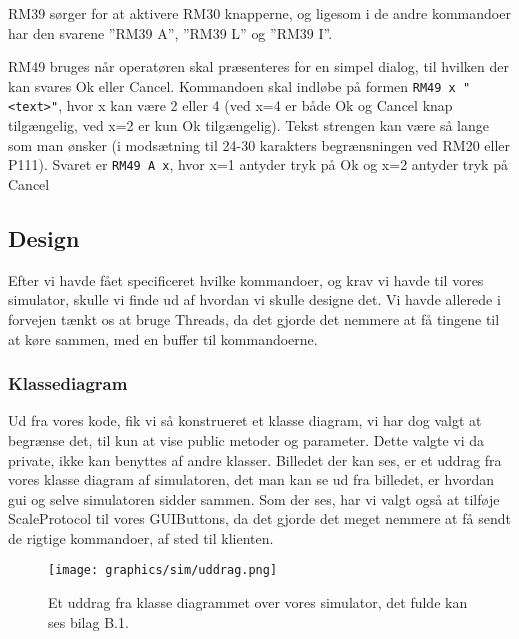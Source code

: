\documentclass[a4paper]{article}
\newenvironment{my_itemize}
{\begin{itemize}
  \setlength{\itemsep}{1pt}
  \setlength{\parskip}{0pt}
  \setlength{\parsep}{0pt}}
{\end{itemize}}
\newenvironment{changemargin}[2]{%
\begin{list}{}{%
\setlength{\topsep}{0pt}%
\setlength{\leftmargin}{#1}%
\setlength{\rightmargin}{#2}%
\setlength{\listparindent}{\parindent}%
\setlength{\itemindent}{\parindent}%
\setlength{\parsep}{\parskip}%
}%
\item[]}{\end{list}}
\begin{document}
\begin{my_itemize}
  \item RM39 sørger for at aktivere RM30 knapperne, og ligesom i de andre kommandoer har den svarene ”RM39 A”, ”RM39 L” og ”RM39 I”.

  \item RM49 bruges når operatøren skal præsenteres for en simpel dialog, til hvilken der kan svares Ok eller Cancel. Kommandoen skal indløbe på formen \texttt{RM49 x "<text>"}, hvor x kan være 2 eller 4 (ved x=4 er både Ok og Cancel knap tilgængelig, ved x=2 er kun Ok tilgængelig). Tekst strengen kan være så lange som man ønsker (i modsætning til 24-30 karakters begrænsningen ved RM20 eller P111). Svaret er \texttt{RM49 A x}, hvor x=1 antyder tryk på Ok og x=2 antyder tryk på Cancel
\end{my_itemize}



\subsection{Design} %

Efter vi havde fået specificeret hvilke kommandoer, og krav vi havde til vores simulator, skulle vi finde ud af hvordan vi skulle designe det. Vi havde allerede i forvejen tænkt os at bruge Threads, da det gjorde det nemmere at få tingene til at køre sammen, med en buffer til kommandoerne.

\subsubsection*{Klassediagram} %

Ud fra vores kode, fik vi så konstrueret et klasse diagram, vi har dog valgt at begrænse det, til kun at vise public metoder og parameter. Dette valgte vi da private, ikke kan benyttes af andre klasser. Billedet der kan ses, er et uddrag fra vores klasse diagram af simulatoren, det man kan se ud fra billedet, er hvordan gui og selve simulatoren sidder sammen. Som der ses, har vi valgt også at tilføje ScaleProtocol til vores GUIButtons, da det gjorde det meget nemmere at få sendt de rigtige kommandoer, af sted til klienten.

\begin{figure}[H]
\begin{changemargin}{-0.5cm}{}
  \centering
  \texttt{[image: graphics/sim/uddrag.png]}
\end{changemargin}
  \caption{Et uddrag fra klasse diagrammet over vores simulator, det fulde kan ses bilag B.1.}
\end{figure}
\end{document}
